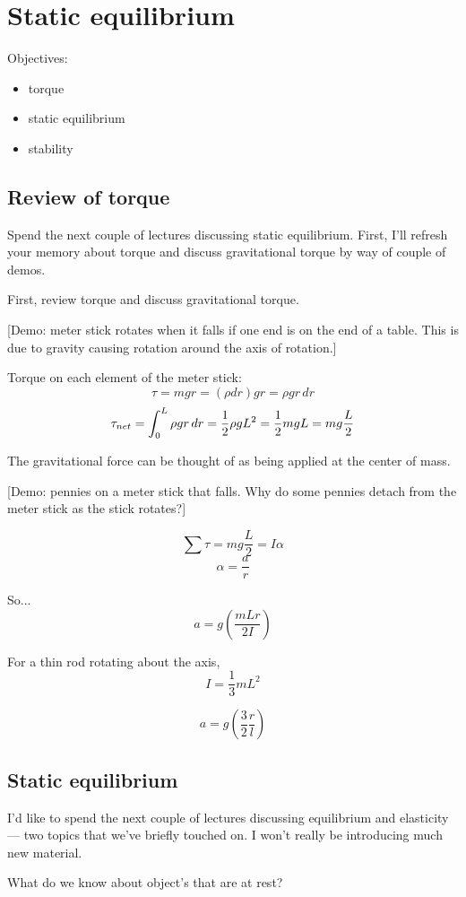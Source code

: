 \section{Static equilibrium}
Objectives:
\begin{itemize}
\item torque
\item static equilibrium
\item stability
\end{itemize}

\hrulefill

\subsection{Review of torque}
Spend the next couple of lectures discussing static equilibrium. First, I'll refresh your memory about torque and discuss gravitational torque by way of couple of demos.

First, review torque and discuss gravitational torque.

[Demo: meter stick rotates when it falls if one end is on the end of a table. This is due to gravity causing rotation around the axis of rotation.]

Torque on each element of the meter stick:
$$\tau=mgr=(\rho dr)gr=\rho g r\,dr$$
$$\tau_{net}=\displaystyle\int_0^L\rho g r\,dr=\frac{1}{2}\rho gL^2=\frac{1}{2}mgL=mg\frac{L}{2}$$

The gravitational force can be thought of as being applied at the center of mass.

[Demo: pennies on a meter stick that falls. Why do some pennies detach from the meter stick as the stick rotates?]

$$\sum\tau=mg\frac{L}{2}=I\alpha$$
$$\alpha=\frac{a}{r}$$

So...
$$a=g\left(\frac{mLr}{2I}\right)$$

For a thin rod rotating about the axis,
$$I=\frac{1}{3}mL^2$$

$$\boxed{a=g\left(\frac{3}{2}\frac{r}{l}\right)}$$

\subsection{Static equilibrium}

I'd like to spend the next couple of lectures discussing equilibrium and elasticity --- two topics that we've briefly touched on. I won't really be introducing much new material.

What do we know about object's that are at rest?

